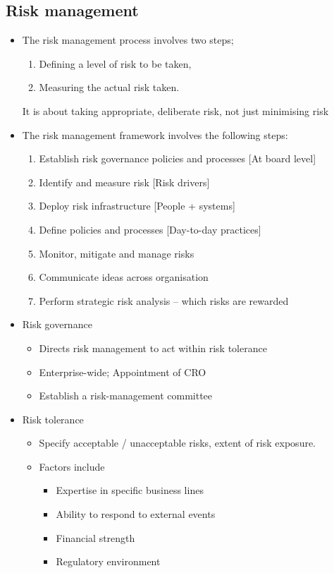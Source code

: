 \documentclass[../notes_compiled.tex]{subfiles}
\begin{document}
\subsection{Risk management}
\begin{itemize}
\item The risk management process involves two steps;
\begin{enumerate}
\item Defining a level of risk to be taken,
\item Measuring the actual risk taken.
\end{enumerate}
It is about taking appropriate, deliberate risk, not just minimising risk
\item The risk management framework involves the following steps:
\begin{enumerate}
\item Establish risk governance policies and processes [At board level]
\item Identify and measure risk [Risk drivers]
\item Deploy risk infrastructure [People + systems]
\item Define policies and processes [Day-to-day practices]
\item Monitor, mitigate and manage risks
\item Communicate ideas across organisation
\item Perform strategic risk analysis -- which risks are rewarded
\end{enumerate}
\item Risk governance
\begin{itemize}
\item Directs risk management to act within risk tolerance
\item Enterprise-wide; Appointment of CRO
\item Establish a risk-management committee
\end{itemize}
\item Risk tolerance
\begin{itemize}
\item Specify acceptable / unacceptable risks, extent of risk exposure.
\item Factors include
\begin{itemize}
\item Expertise in specific business lines
\item Ability to respond to external events
\item Financial strength
\item Regulatory environment

\end{itemize}
\end{itemize}
\end{itemize}
\end{document}

